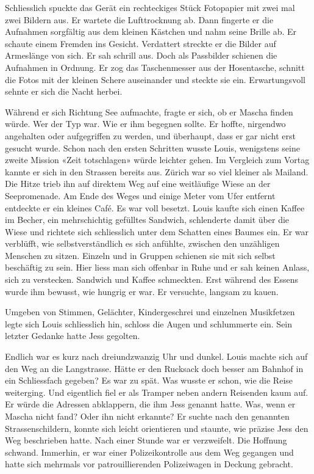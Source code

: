 Schliesslich spuckte das Gerät ein rechteckiges Stück Fotopapier mit
zwei mal zwei Bildern aus. Er wartete die Lufttrocknung ab. Dann
fingerte er die Aufnahmen sorgfältig aus dem kleinen Kästchen und nahm
seine Brille ab. Er schaute einem Fremden ins Gesicht. Verdattert
streckte er die Bilder auf Armeslänge von sich. Er sah schrill aus. Doch
als Passbilder schienen die Aufnahmen in Ordnung.
Er zog das Taschenmesser aus der Hosentasche, schnitt die Fotos mit der
kleinen Schere auseinander und steckte sie ein. Erwartungsvoll sehnte er sich die Nacht herbei. 

Während er sich Richtung See aufmachte, fragte er sich, ob er Mascha finden würde. Wer der Typ war. Wie er ihm begegnen sollte. Er hoffte, nirgendwo angehalten oder aufgegriffen zu werden, und überhaupt, dass er gar nicht erst gesucht wurde. Schon nach den ersten Schritten wusste Louis, wenigstens seine zweite Mission «Zeit totschlagen» würde leichter gehen. 
Im  Vergleich zum Vortag kannte er sich in den Strassen bereits aus. Zürich war so viel kleiner als Mailand. 
Die Hitze trieb ihn auf direktem Weg auf eine weitläufige Wiese an der Seepromenade. Am Ende des Weges und einige Meter vom Ufer entfernt entdeckte er ein kleines Café. Es war voll besetzt. Louis kaufte sich einen Kaffee im Becher, ein mehrschichtig gefülltes Sandwich, schlenderte damit über die Wiese und richtete sich schliesslich unter dem Schatten eines Baumes ein. Er war verblüfft, wie selbstverständlich es sich anfühlte, zwischen den unzähligen Menschen zu sitzen. Einzeln und in Gruppen schienen sie mit sich selbst beschäftig zu sein. Hier liess man sich offenbar in Ruhe und er sah keinen Anlass, sich zu verstecken. Sandwich und Kaffee schmeckten. Erst während des Essens wurde ihm bewusst, wie hungrig er war. Er versuchte, langsam zu kauen. 

Umgeben von Stimmen, Gelächter, Kindergeschrei und einzelnen Musikfetzen legte sich Louis schliesslich hin, schloss die Augen und schlummerte ein. Sein letzter Gedanke hatte Jess gegolten.

\sectionbreak

Endlich war es kurz nach dreiundzwanzig Uhr und dunkel.
Louis machte sich auf den Weg an die Langstrasse. Hätte er den Rucksack doch besser am Bahnhof in ein Schliessfach gegeben? Es war zu spät. Was wusste er schon, wie die Reise weiterging. Und eigentlich fiel er als Tramper neben andern Reisenden kaum auf. Er würde die Adressen abklappern, die ihm Jess genannt hatte. Was, wenn er Mascha nicht fand?
Oder ihn nicht erkannte?
Er suchte nach den genannten Strassenschildern, konnte sich leicht
orientieren und staunte, wie präzise Jess den Weg beschrieben hatte. 
Nach einer Stunde war er verzweifelt. Die Hoffnung schwand. Immerhin, 
er war einer Polizeikontrolle aus dem Weg gegangen und hatte sich mehrmals vor patrouillierenden
Polizeiwagen in Deckung gebracht.

